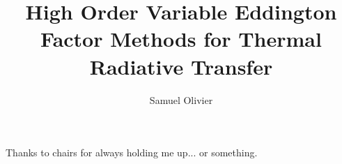 \documentclass[todo]{dissertation}
\begin{document}
\title{High Order Variable Eddington Factor Methods for Thermal Radiative Transfer}
\author{Samuel Olivier}
\maketitle

\copyrightpage

\begin{abstract}

\end{abstract}

\begin{frontmatter}

\begin{KeepFromToc}
\tableofcontents
\end{KeepFromToc}
\clearpage

\printglossary[style=april_gloss_style]
\clearpage


\begin{acknowledgements}
Thanks to chairs for always holding me up... or something. 
\end{acknowledgements}
\end{frontmatter}

\pagestyle{headings}










\appendix 


\clearpage
\printbibliography
\end{document}
